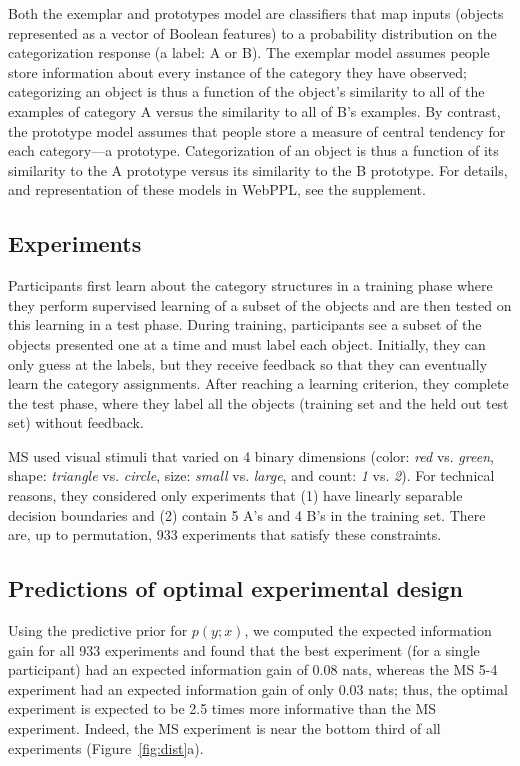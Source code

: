 \documentclass{article}
\begin{document}
Both the exemplar and prototypes model are classifiers that map inputs (objects represented as a vector of Boolean features) to a probability distribution on the categorization response (a label: A or B).
The exemplar model assumes people store information about every instance of the category they have observed; categorizing an object is thus a function of the object's similarity to all of the examples of category A versus the similarity to all of B's examples.
By contrast, the prototype model assumes that people store a measure of central tendency for each category---a prototype.
Categorization of an object is thus a function of its similarity to the A prototype versus its similarity to the B prototype.
For details, and representation of these models in WebPPL, see the supplement.

\subsection{Experiments}

Participants first learn about the category structures in a training phase where they perform supervised learning of a subset of the objects and are then tested on this learning in a test phase.
During training, participants see a subset of the objects presented one at a time and must label each object.
Initially, they can only guess at the labels, but they receive feedback so that they can eventually learn the category assignments.
After reaching a learning criterion, they complete the test phase, where they label all the objects (training set and the held out test set) without feedback.

MS used visual stimuli that varied on 4 binary dimensions (color: \emph{red} vs. \emph{green}, shape: \emph{triangle} vs. \emph{circle}, size: \emph{small} vs. \emph{large}, and count: \emph{1} vs. \emph{2}).
For technical reasons, they considered only experiments that (1) have linearly separable decision boundaries and (2) contain 5 A's and 4 B's in the training set.
There are, up to permutation, 933 experiments that satisfy these constraints.

\subsection{Predictions of optimal experimental design}

Using the predictive prior for $p(y; x)$, we computed the expected information gain for all 933 experiments and found that the best experiment (for a single participant) had an expected information gain of 0.08 nats, whereas the MS 5-4 experiment had an expected information gain of only 0.03 nats; thus, the optimal experiment is expected to be 2.5 times more informative than the MS experiment.
Indeed, the MS experiment is near the bottom third of all experiments (Figure~\ref{fig:dist}a).
\end{document}
